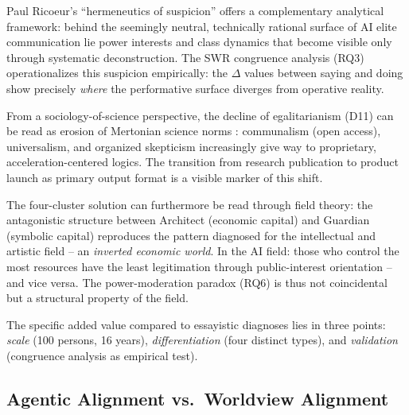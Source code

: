\documentclass[12pt,a4paper]{article}
\begin{document}
Paul Ricoeur's ``hermeneutics of suspicion'' \citep{Ricoeur1970} offers a complementary analytical framework: behind the seemingly neutral, technically rational surface of AI elite communication lie power interests and class dynamics that become visible only through systematic deconstruction. The SWR congruence analysis (RQ3) operationalizes this suspicion empirically: the $\Delta$ values between saying and doing show precisely \emph{where} the performative surface diverges from operative reality.

From a sociology-of-science perspective, the decline of egalitarianism (D11) can be read as erosion of Mertonian science norms \citep{Merton1973}: communalism (open access), universalism, and organized skepticism increasingly give way to proprietary, acceleration-centered logics. The transition from research publication to product launch as primary output format is a visible marker of this shift.

The four-cluster solution can furthermore be read through field theory: the antagonistic structure between Architect (economic capital) and Guardian (symbolic capital) reproduces the pattern \citet{Bourdieu1992} diagnosed for the intellectual and artistic field -- an \emph{inverted economic world}. In the AI field: those who control the most resources have the least legitimation through public-interest orientation -- and vice versa. The power-moderation paradox (RQ6) is thus not coincidental but a structural property of the field.

The specific added value compared to essayistic diagnoses lies in three points: \emph{scale} (100 persons, 16 years), \emph{differentiation} (four distinct types), and \emph{validation} (congruence analysis as empirical test).


\subsection{Agentic Alignment vs.\ Worldview Alignment}
\label{sec:diskussion:alignment}
\end{document}
